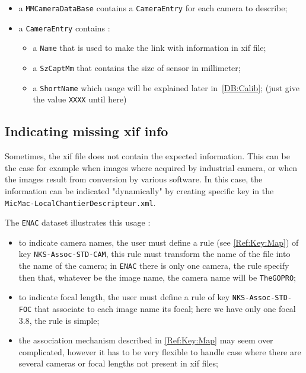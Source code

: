 \begin{itemize}
    \item a {\tt MMCameraDataBase} contains  a {\tt CameraEntry} for each  camera
          to describe;
    \item a {\tt CameraEntry} contains :

 
     \begin{itemize}
           \item a {\tt Name} that is used to make the link with information in xif file;
           \item a {\tt SzCaptMm} that contains the size of sensor in millimeter;
           \item a {\tt ShortName} which usage will be explained later  in~\ref{DB:Calib};
                (just give the value {\tt XXXX} until here)
     \end{itemize}
\end{itemize}


\subsection{Indicating missing xif info}

Sometimes, the xif file does not contain the expected information. This can be the
case for example when images where acquired by industrial camera, or when the images
result from conversion by various software. In this case, the information can be indicated "dynamically"
by creating specific key in the {\tt  MicMac-LocalChantierDescripteur.xml}.

The {\tt ENAC} dataset  illustrates this usage :

\begin{itemize}
    \item to indicate camera names, the user must define a rule 
           (see \ref{Ref:Key:Map}) of key  {\tt NKS-Assoc-STD-CAM}, this rule must
           transform the name of the file into the name of the camera;
           in {\tt ENAC} there is only one camera, the rule specify  then that,
           whatever be the image name, the camera name will be {\tt TheGOPRO};
 

    \item to indicate focal length, the user must define a rule 
          of key {\tt NKS-Assoc-STD-FOC} that associate to each image name
          its focal; here we have only one focal $3.8$, the rule is simple;


    \item the association mechanism described in \ref{Ref:Key:Map} may seem 
          over complicated, however it has to be very flexible to handle case
          where there are several cameras or focal lengths not present in xif files;

\end{itemize}



